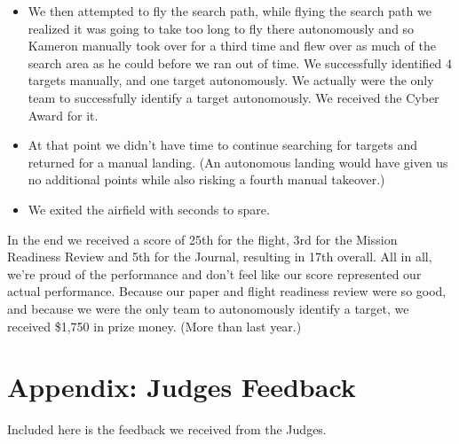\documentclass[]{auvsi_doc}
\begin{document}
\begin{itemize}
	\item    We then attempted to fly the search path, while flying the search path we realized it was going to take too long to fly there autonomously and so Kameron manually took over for a third time and flew over as much of the search area as he could before we ran out of time. We successfully identified 4 targets manually, and one target autonomously. We actually were the only team to successfully identify a target autonomously. We received the Cyber Award for it.
	\item    At that point we didn’t have time to continue searching for targets and returned for a manual landing. (An autonomous landing would have given us no additional points while also risking a fourth manual takeover.)
	\item    We exited the airfield with seconds to spare.
\end{itemize}

In the end we received a score of 25th for the flight, 3rd for the Mission Readiness Review and 5th for the Journal, resulting in 17th overall. 
All in all, we’re proud of the performance and don’t feel like our score represented our actual performance. Because our paper and flight readiness review were so good, and because we were the only team to autonomously identify a target, we received \$1,750 in prize money. (More than last year.)


\section{Appendix: Judges Feedback}
Included here is the feedback we received from the Judges.

\end{document}
